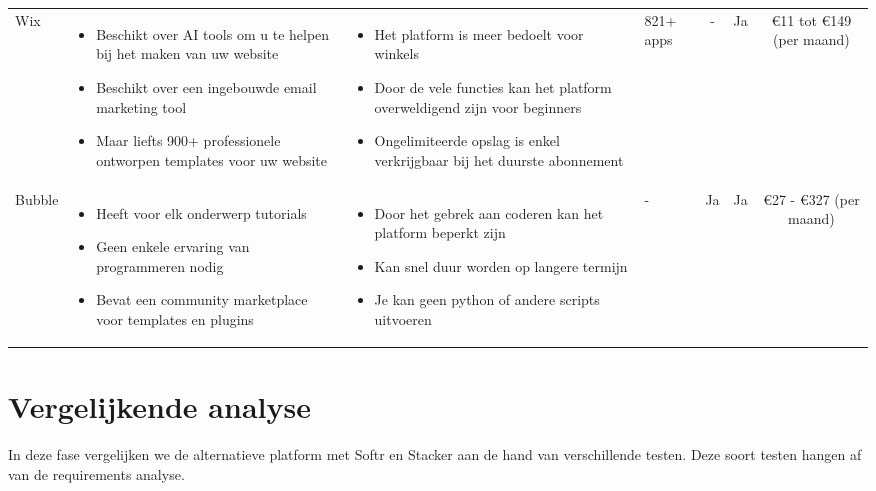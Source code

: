 \begin{longtable}{p{2.2cm} p{4.4cm} p{3.4cm} p{2.2cm} c c c}
    Wix & 
    \begin{itemize}

        \item Beschikt over AI tools om u te helpen bij het maken van uw website
        \item Beschikt over een ingebouwde email marketing tool
        \item Maar liefts 900+ professionele ontworpen templates voor uw website
    \end{itemize} & 
    \begin{itemize}
        \item Het platform is meer bedoelt voor winkels
        \item Door de vele functies kan het platform overweldigend zijn voor beginners
        \item Ongelimiteerde opslag is enkel verkrijgbaar bij het duurste abonnement
    \end{itemize} &
    821+ apps &
    - &
    Ja &
    €11 tot €149 (per maand)\\

    Bubble & 
    \begin{itemize}
        \item Heeft voor elk onderwerp tutorials
        \item Geen enkele ervaring van programmeren nodig
        \item Bevat een community marketplace voor templates en plugins
    \end{itemize} & 
    \begin{itemize}
        \item Door het gebrek aan coderen kan het platform beperkt zijn
        \item Kan snel duur worden op langere termijn
        \item Je kan geen python of andere scripts uitvoeren
    \end{itemize} &
    - &
    Ja &
    Ja &
    €27 - €327 (per maand)\\
\end{longtable}


\section*{Vergelijkende analyse}
\label{sec:vergelijkende-analyse}
In deze fase vergelijken we de alternatieve platform met Softr en Stacker aan de hand van verschillende testen. 
Deze soort testen hangen af van de requirements analyse.


